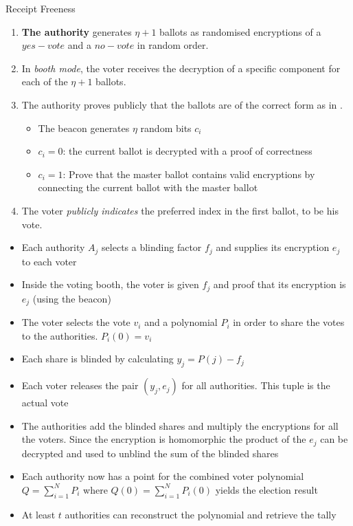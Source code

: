\documentclass{beamer}
\begin{document}
\begin{frame}[allowframebreaks]{Receipt Freeness \cite{BT94}}
\framebreak

\begin{enumerate}
\item \textbf{The authority} generates $\eta+1$ ballots as randomised encryptions of a $yes-vote$ and a $no-vote$ in random order.
\item In \textit{booth mode}, the voter receives the decryption of a specific component for each of the $\eta+1$ ballots.
\item The authority proves publicly that the ballots are of the correct form as in \cite{CF85}.
\begin{itemize}
\item The beacon generates $\eta$ random bits $c_i$
\item $c_i=0$: the current ballot is decrypted with a proof of correctness
\item $c_i=1$: Prove that the master ballot contains valid encryptions by connecting the current ballot with the master ballot
\end{itemize}
\item The voter \textit{publicly indicates} the preferred index in the first ballot, to be his vote.
\end{enumerate}

\framebreak

\begin{itemize}
\item Each authority $A_j$ selects a blinding factor $f_j$ and supplies its encryption $e_j$ to each voter
\item Inside the voting booth, the voter is given $f_j$ and proof that its encryption is $e_j$ (using the beacon)
\item The voter selects the vote $v_i$ and a polynomial $P_i$ in order to share the votes to the authorities. $P_i(0)=v_i$
\item Each share is blinded by calculating $y_j = P(j) - f_j$
\item Each voter releases the pair $(y_j,e_j)$ for all authorities. This tuple is the actual vote
\item The authorities add the blinded shares and multiply the encryptions for all the voters. Since the encryption is homomorphic the product of the $e_j$ can be decrypted and used to unblind the sum of the blinded shares
\item Each authority now has a point for the combined voter polynomial $Q = \sum_{i=1}^N P_i$ where $Q(0) = \sum_{i=1}^N P_i(0)$ yields the election result 
\item At least $t$ authorities can reconstruct the polynomial and retrieve the tally
\end{itemize}


\end{frame}
\end{document}
